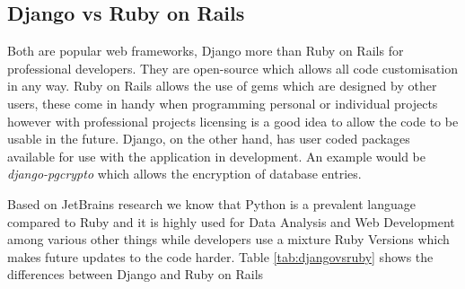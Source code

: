 \documentclass[../main.tex]{subfiles}
\begin{document}
      
\subsection{Django vs Ruby on Rails} 
Both are popular web frameworks, Django more than Ruby on Rails for professional developers. They are open-source which allows all code customisation in any way. Ruby on Rails allows the use of gems which are designed by other users, these come in handy when programming personal or individual projects however with professional projects licensing is a good idea to allow the code to be usable in the future\cite{djangovsrails}. Django, on the other hand, has user coded packages available for use with the application in development. An example would be \textit{django-pgcrypto}\cite{dbencrypt} which allows the encryption of database entries. 

Based on JetBrains research\cite{pythonresearch2018}\cite{rubyresearch2018} we know that Python is a prevalent language compared to Ruby and it is highly used for Data Analysis and Web Development among various other things while developers use a mixture Ruby Versions which makes future updates to the code harder. Table \ref{tab:djangovsruby} shows the differences between Django and Ruby on Rails
\end{document}
